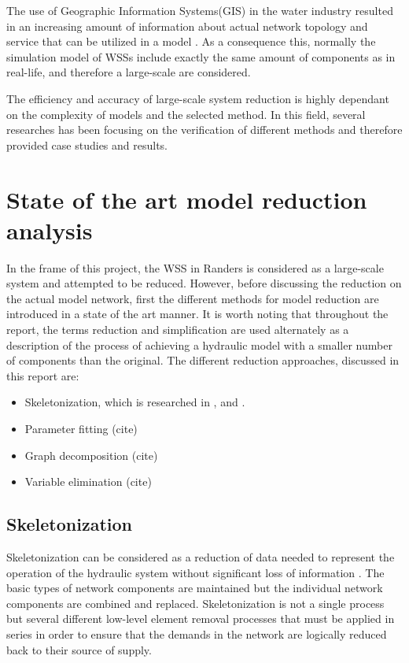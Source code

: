 The use of Geographic Information Systems(GIS) in the water industry resulted in an increasing amount of information about actual network topology and service that can be utilized in a model \cite{johnson2016geographic}. As a consequence this, normally the simulation model of WSSs include exactly the same amount of components as in real-life, and therefore a large-scale are considered. 

The efficiency and accuracy of large-scale system reduction is highly dependant on the complexity of models and the selected method. In this field, several researches has been focusing on the verification of different methods and therefore provided case studies and results. 

\section{State of the art model reduction analysis}
\label{state_of_the_art_model_reduction_analysis}

In the frame of this project, the WSS in Randers is considered as a large-scale system and attempted to be reduced. However, before discussing the reduction on the actual model network, first the different methods for model reduction are introduced in a state of the art manner. It is worth noting that throughout the report, the terms reduction and simplification are used alternately as a description of the process of achieving a hydraulic model with a smaller number of components than the original. The different reduction approaches, discussed in this report are: 

\begin{itemize}
\item Skeletonization, which is researched in \cite{walski2003advanced}, \cite{MARTINEZSOLANO2017286} and \cite{battlepaper}.
\item Parameter fitting (cite)
\item Graph decomposition (cite)
\item Variable elimination (cite)
\end{itemize}

\subsection{Skeletonization}
\label{skeletonization}

Skeletonization can be considered as a reduction of data needed to represent the operation of the hydraulic system without significant loss of information \cite{reduction_PHD}. The basic types of network components are maintained but the individual network components are combined and replaced. Skeletonization is not a single process but several different low-level element removal processes that must be applied in series in order to ensure that the demands in the network are logically reduced back to their source of supply. 

